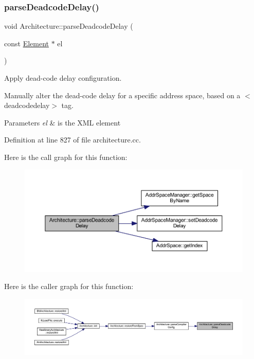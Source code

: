 \subsubsection{\texorpdfstring{parseDeadcodeDelay()}{parseDeadcodeDelay()}}
{\footnotesize\ttfamily void Architecture\+::parse\+Deadcode\+Delay (\begin{DoxyParamCaption}\item[{const \mbox{\hyperlink{class_element}{Element}} $\ast$}]{el }\end{DoxyParamCaption})\hspace{0.3cm}{\ttfamily [protected]}}



Apply dead-\/code delay configuration. 

Manually alter the dead-\/code delay for a specific address space, based on a $<$deadcodedelay$>$ tag. 
\begin{DoxyParams}{Parameters}
{\em el} & is the X\+ML element \\
\hline
\end{DoxyParams}


Definition at line 827 of file architecture.\+cc.

Here is the call graph for this function\+:
\nopagebreak
\begin{figure}[H]
\begin{center}
\leavevmode
\includegraphics[width=350pt]{class_architecture_a29ad4de633bc630b03425ab46b31f42b_cgraph}
\end{center}
\end{figure}
Here is the caller graph for this function\+:
\nopagebreak
\begin{figure}[H]
\begin{center}
\leavevmode
\includegraphics[width=350pt]{class_architecture_a29ad4de633bc630b03425ab46b31f42b_icgraph}
\end{center}
\end{figure}
\mbox{\label{class_architecture_a1ea36f2638d65351dd00ba06fe0dc00b}} 
